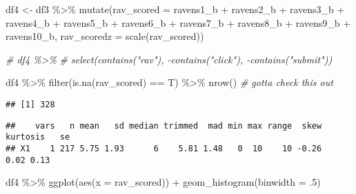 \documentclass[
]{article}
\newenvironment{Shaded}{\begin{snugshade}}{\end{snugshade}}
\newcommand{\AttributeTok}[1]{\textcolor[rgb]{0.77,0.63,0.00}{#1}}
\newcommand{\CommentTok}[1]{\textcolor[rgb]{0.56,0.35,0.01}{\textit{#1}}}
\newcommand{\DecValTok}[1]{\textcolor[rgb]{0.00,0.00,0.81}{#1}}
\newcommand{\FunctionTok}[1]{\textcolor[rgb]{0.00,0.00,0.00}{#1}}
\newcommand{\NormalTok}[1]{#1}
\newcommand{\OtherTok}[1]{\textcolor[rgb]{0.56,0.35,0.01}{#1}}
\newcommand{\SpecialCharTok}[1]{\textcolor[rgb]{0.00,0.00,0.00}{#1}}
\begin{document}
\begin{Shaded}
\begin{Highlighting}[]
\NormalTok{df4 }\OtherTok{\textless{}{-}}\NormalTok{ df3 }\SpecialCharTok{\%\textgreater{}\%} 
  \FunctionTok{mutate}\NormalTok{(}\AttributeTok{rav\_scored =}\NormalTok{ ravens1\_b }\SpecialCharTok{+}\NormalTok{ ravens2\_b }\SpecialCharTok{+}\NormalTok{ ravens3\_b }\SpecialCharTok{+}\NormalTok{ ravens4\_b }\SpecialCharTok{+}\NormalTok{ ravens5\_b }\SpecialCharTok{+}
\NormalTok{           ravens6\_b }\SpecialCharTok{+}\NormalTok{ ravens7\_b }\SpecialCharTok{+}\NormalTok{ ravens8\_b }\SpecialCharTok{+}\NormalTok{ ravens9\_b }\SpecialCharTok{+}\NormalTok{ ravens10\_b,}
         \AttributeTok{rav\_scoredz =} \FunctionTok{scale}\NormalTok{(rav\_scored))}

\CommentTok{\# df4 \%\textgreater{}\% }
\CommentTok{\#   select(contains("rav"), {-}contains("click"), {-}contains("submit"))}

\NormalTok{df4 }\SpecialCharTok{\%\textgreater{}\%} 
  \FunctionTok{filter}\NormalTok{(}\FunctionTok{is.na}\NormalTok{(rav\_scored) }\SpecialCharTok{==}\NormalTok{ T) }\SpecialCharTok{\%\textgreater{}\%} 
  \FunctionTok{nrow}\NormalTok{() }\CommentTok{\# gotta check this out}
\end{Highlighting}
\end{Shaded}

\begin{verbatim}
## [1] 328
\end{verbatim}

\begin{Shaded}
\end{Shaded}

\begin{verbatim}
##    vars   n mean   sd median trimmed  mad min max range  skew kurtosis   se
## X1    1 217 5.75 1.93      6    5.81 1.48   0  10    10 -0.26     0.02 0.13
\end{verbatim}

\begin{Shaded}
\begin{Highlighting}[]
\NormalTok{df4 }\SpecialCharTok{\%\textgreater{}\%}
  \FunctionTok{ggplot}\NormalTok{(}\FunctionTok{aes}\NormalTok{(}\AttributeTok{x =}\NormalTok{ rav\_scored)) }\SpecialCharTok{+}
  \FunctionTok{geom\_histogram}\NormalTok{(}\AttributeTok{binwidth =}\NormalTok{ .}\DecValTok{5}\NormalTok{)}
\end{Highlighting}
\end{Shaded}
\end{document}
